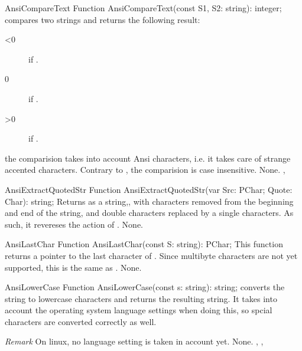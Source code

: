 
 
\begin{function}{AnsiCompareText}
\Declaration
Function AnsiCompareText(const S1, S2: string): integer;
\Description
\Description
{} compares two strings and returns the following
result:
\begin{description}
\item[<0]  if .
\item[0]  if .
\item[>0] if .
\end{description}
the comparision takes into account Ansi characters, i.e. it takes
care of strange accented characters. Contrary to , 
the comparision is case insensitive.
\Errors
None.
\SeeAlso
{}, 
\end{function}



\begin{function}{AnsiExtractQuotedStr}
\Declaration
Function AnsiExtractQuotedStr(var Src: PChar; Quote: Char): string;
\Description
{} Returns  as a string,, with  
characters removed from the beginning and end of the string, and double 
 characters replaced by a single  characters. 
As such, it revereses the action of .
\Errors
None.
\SeeAlso
{}
\end{function}


 
\begin{function}{AnsiLastChar}
\Declaration
Function AnsiLastChar(const S: string): PChar;
\Description
This function returns a pointer to the last character of .
Since multibyte characters are not yet supported, this is the same
as .
\Errors
None.
\SeeAlso
{}
\end{function}


 
\begin{function}{AnsiLowerCase}
\Declaration
Function AnsiLowerCase(const s: string): string;
\Description
{} converts the string  to lowercase characters 
and returns the resulting string. 
It takes into account the operating system language
settings when doing this, so spcial characters are converted correctly as
well.

{\em Remark} On linux, no language setting is taken in account yet.
\Errors
None.
\SeeAlso
{}, , 
\end{function}

